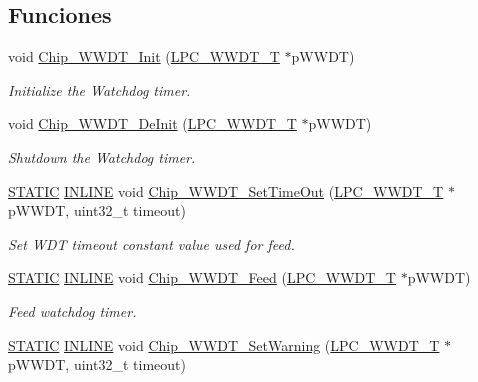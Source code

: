 \subsection*{Funciones}
\begin{DoxyCompactItemize}
\item 
void \hyperlink{group___w_w_d_t__18_x_x__43_x_x_gab4cdf632b42394855a6b8cf969f49693}{Chip\+\_\+\+W\+W\+D\+T\+\_\+\+Init} (\hyperlink{struct_l_p_c___w_w_d_t___t}{L\+P\+C\+\_\+\+W\+W\+D\+T\+\_\+T} $\ast$p\+W\+W\+DT)
\begin{DoxyCompactList}\small\item\em Initialize the Watchdog timer. \end{DoxyCompactList}\item 
void \hyperlink{group___w_w_d_t__18_x_x__43_x_x_gab536f1a59f06be21a3d9880dffd9f99b}{Chip\+\_\+\+W\+W\+D\+T\+\_\+\+De\+Init} (\hyperlink{struct_l_p_c___w_w_d_t___t}{L\+P\+C\+\_\+\+W\+W\+D\+T\+\_\+T} $\ast$p\+W\+W\+DT)
\begin{DoxyCompactList}\small\item\em Shutdown the Watchdog timer. \end{DoxyCompactList}\item 
\hyperlink{group___l_p_c___types___public___macros_ga10b2d890d871e1489bb02b7e70d9bdfb}{S\+T\+A\+T\+IC} \hyperlink{spifi__18xx__43xx_8h_a2eb6f9e0395b47b8d5e3eeae4fe0c116}{I\+N\+L\+I\+NE} void \hyperlink{group___w_w_d_t__18_x_x__43_x_x_ga3147a15042f4276588c83e98b0a1b996}{Chip\+\_\+\+W\+W\+D\+T\+\_\+\+Set\+Time\+Out} (\hyperlink{struct_l_p_c___w_w_d_t___t}{L\+P\+C\+\_\+\+W\+W\+D\+T\+\_\+T} $\ast$p\+W\+W\+DT, uint32\+\_\+t timeout)
\begin{DoxyCompactList}\small\item\em Set W\+DT timeout constant value used for feed. \end{DoxyCompactList}\item 
\hyperlink{group___l_p_c___types___public___macros_ga10b2d890d871e1489bb02b7e70d9bdfb}{S\+T\+A\+T\+IC} \hyperlink{spifi__18xx__43xx_8h_a2eb6f9e0395b47b8d5e3eeae4fe0c116}{I\+N\+L\+I\+NE} void \hyperlink{group___w_w_d_t__18_x_x__43_x_x_ga88db6aef307efd5cbc629695c4678006}{Chip\+\_\+\+W\+W\+D\+T\+\_\+\+Feed} (\hyperlink{struct_l_p_c___w_w_d_t___t}{L\+P\+C\+\_\+\+W\+W\+D\+T\+\_\+T} $\ast$p\+W\+W\+DT)
\begin{DoxyCompactList}\small\item\em Feed watchdog timer. \end{DoxyCompactList}\item 
\hyperlink{group___l_p_c___types___public___macros_ga10b2d890d871e1489bb02b7e70d9bdfb}{S\+T\+A\+T\+IC} \hyperlink{spifi__18xx__43xx_8h_a2eb6f9e0395b47b8d5e3eeae4fe0c116}{I\+N\+L\+I\+NE} void \hyperlink{group___w_w_d_t__18_x_x__43_x_x_ga83ecb3bc2ce68b3deb8343a7d76e3d7e}{Chip\+\_\+\+W\+W\+D\+T\+\_\+\+Set\+Warning} (\hyperlink{struct_l_p_c___w_w_d_t___t}{L\+P\+C\+\_\+\+W\+W\+D\+T\+\_\+T} $\ast$p\+W\+W\+DT, uint32\+\_\+t timeout)

\end{DoxyCompactItemize}

